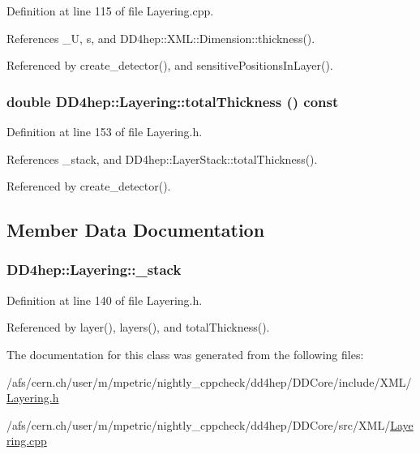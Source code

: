 Definition at line 115 of file Layering.cpp.

References \_\-U, s, and DD4hep::XML::Dimension::thickness().

Referenced by create\_\-detector(), and sensitivePositionsInLayer().\hypertarget{class_d_d4hep_1_1_layering_a374decca74d33a2210637096fef9f23e}{
\subsubsection[{totalThickness}]{\setlength{\rightskip}{0pt plus 5cm}double DD4hep::Layering::totalThickness () const}}
\label{class_d_d4hep_1_1_layering_a374decca74d33a2210637096fef9f23e}


Definition at line 153 of file Layering.h.

References \_\-stack, and DD4hep::LayerStack::totalThickness().

Referenced by create\_\-detector().

\subsection{Member Data Documentation}
\hypertarget{class_d_d4hep_1_1_layering_a3abc06c9a003b7e5cb163660652a6318}{
\subsubsection[{\_\-stack}]{ {\bf DD4hep::Layering::\_\-stack}}}
\label{class_d_d4hep_1_1_layering_a3abc06c9a003b7e5cb163660652a6318}


Definition at line 140 of file Layering.h.

Referenced by layer(), layers(), and totalThickness().

The documentation for this class was generated from the following files:\begin{DoxyCompactItemize}
\item 
/afs/cern.ch/user/m/mpetric/nightly\_\-cppcheck/dd4hep/DDCore/include/XML/\hyperlink{_layering_8h}{Layering.h}\item 
/afs/cern.ch/user/m/mpetric/nightly\_\-cppcheck/dd4hep/DDCore/src/XML/\hyperlink{_layering_8cpp}{Layering.cpp}\end{DoxyCompactItemize}
